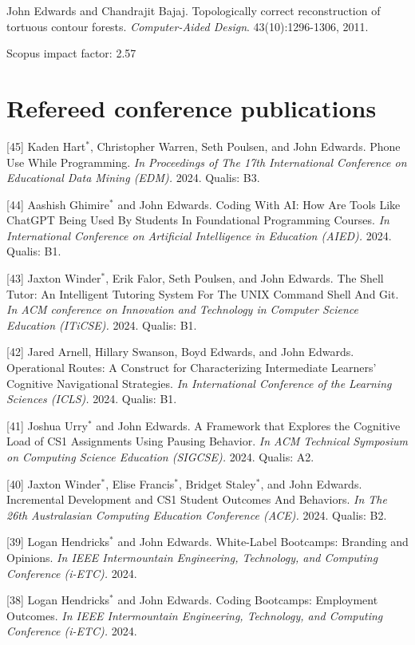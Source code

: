 \documentclass[margin,line]{res}
\newcommand{\pubunder}[1]{#1}
\newcommand{\jnum}[1]{[#1]}
\newcommand{\cnum}[1]{[#1]}
\begin{document}
\begin{resume}
\jnum{1} \protect \pubunder{John Edwards} and Chandrajit Bajaj. Topologically correct reconstruction of tortuous contour forests. \textit{Computer-Aided Design}. 43(10):1296-1306, 2011.
\begin{IMPACT}
Scopus impact factor: 2.57 %
\end{IMPACT}


\section{\sc Refereed conference publications}
\cnum{45} Kaden Hart$^*$, Christopher Warren, Seth Poulsen, and John Edwards. Phone Use While Programming. \textit{In Proceedings of The 17th International Conference on Educational Data Mining (EDM).} 2024. Qualis: B3.

\cnum{44} Aashish Ghimire$^*$ and John Edwards. Coding With AI: How Are Tools Like ChatGPT Being Used By Students In Foundational Programming Courses. \textit{In International Conference on Artificial Intelligence in Education (AIED).} 2024. Qualis: B1.

\cnum{43} Jaxton Winder$^*$, Erik Falor, Seth Poulsen, and John Edwards. The Shell Tutor: An Intelligent Tutoring System For The UNIX Command Shell And Git. \textit{In ACM conference on Innovation and Technology in Computer Science Education (ITiCSE).} 2024. Qualis: B1.

\cnum{42} Jared Arnell, Hillary Swanson, Boyd Edwards, and John Edwards. Operational Routes: A Construct for Characterizing Intermediate Learners’ Cognitive Navigational Strategies. \textit{In International Conference of the Learning Sciences (ICLS).} 2024. Qualis: B1.

\cnum{41} Joshua Urry$^*$ and John Edwards. A Framework that Explores the Cognitive Load of CS1 Assignments Using Pausing Behavior. \textit{In ACM Technical Symposium on Computing Science Education (SIGCSE).} 2024. Qualis: A2.

\cnum{40} Jaxton Winder$^*$, Elise Francis$^*$, Bridget Staley$^*$, and John Edwards. Incremental Development and CS1 Student Outcomes And Behaviors. \textit{In The 26th Australasian Computing Education Conference (ACE).} 2024. Qualis: B2.

\cnum{39} Logan Hendricks$^*$ and John Edwards. White-Label Bootcamps: Branding and Opinions. \textit{In IEEE Intermountain Engineering, Technology, and Computing Conference (i-ETC).} 2024.

\cnum{38} Logan Hendricks$^*$ and John Edwards. Coding Bootcamps: Employment Outcomes. \textit{In IEEE Intermountain Engineering, Technology, and Computing Conference (i-ETC).} 2024.


\end{resume}
\end{document}
